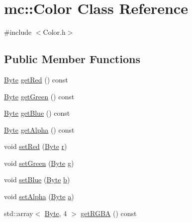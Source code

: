 \hypertarget{classmc_1_1_color}{}\section{mc\+:\+:Color Class Reference}
\label{classmc_1_1_color}


{\ttfamily \#include $<$Color.\+h$>$}

\subsection*{Public Member Functions}
\begin{DoxyCompactItemize}
\item 
\hyperlink{namespacemc_a64bc4fa1f43bc4da5c7ac98c04c863e8}{Byte} \hyperlink{classmc_1_1_color_a45fc6165528af4e8c4c878fbb43434eb}{get\+Red} () const 
\item 
\hyperlink{namespacemc_a64bc4fa1f43bc4da5c7ac98c04c863e8}{Byte} \hyperlink{classmc_1_1_color_acd7f870b8763b4bf4e9004363615ebd4}{get\+Green} () const 
\item 
\hyperlink{namespacemc_a64bc4fa1f43bc4da5c7ac98c04c863e8}{Byte} \hyperlink{classmc_1_1_color_af1a18db8e721f537d8aa3d61b6a38fae}{get\+Blue} () const 
\item 
\hyperlink{namespacemc_a64bc4fa1f43bc4da5c7ac98c04c863e8}{Byte} \hyperlink{classmc_1_1_color_a424a22022102a0fac492623319df49ff}{get\+Alpha} () const 
\item 
void \hyperlink{classmc_1_1_color_a2c402622da696c33778dd1116383de6d}{set\+Red} (\hyperlink{namespacemc_a64bc4fa1f43bc4da5c7ac98c04c863e8}{Byte} \hyperlink{classmc_1_1_color_a21e476d9238f36f210f5cd35868b3d08}{r})
\item 
void \hyperlink{classmc_1_1_color_ae34ebd62353042648e84efd705163d96}{set\+Green} (\hyperlink{namespacemc_a64bc4fa1f43bc4da5c7ac98c04c863e8}{Byte} \hyperlink{classmc_1_1_color_a16c106a491d5ab2deef17a0a5f4c0a95}{g})
\item 
void \hyperlink{classmc_1_1_color_ad8ba9328b871cc8d08785b6ad03d4d2c}{set\+Blue} (\hyperlink{namespacemc_a64bc4fa1f43bc4da5c7ac98c04c863e8}{Byte} \hyperlink{classmc_1_1_color_afd537e7822ea1674f3f66db22b343ec0}{b})
\item 
void \hyperlink{classmc_1_1_color_a9c82e480305368648a769b212508ae44}{set\+Alpha} (\hyperlink{namespacemc_a64bc4fa1f43bc4da5c7ac98c04c863e8}{Byte} \hyperlink{classmc_1_1_color_a6d83e513538a31ebb79a310bb3249548}{a})
\item 
std\+::array$<$ \hyperlink{namespacemc_a64bc4fa1f43bc4da5c7ac98c04c863e8}{Byte}, 4 $>$ \hyperlink{classmc_1_1_color_a5120535bf90fa4cc016b16a927288d22}{get\+R\+G\+BA} () const 

\end{DoxyCompactItemize}
